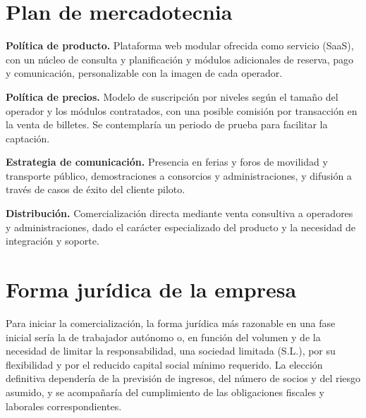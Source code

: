 \section{Plan de mercadotecnia}
\label{sec:negocio-marketing}

\textbf{Política de producto.} Plataforma web modular ofrecida como servicio (SaaS), con un núcleo de consulta y planificación y módulos adicionales de reserva, pago y comunicación, personalizable con la imagen de cada operador.

\textbf{Política de precios.} Modelo de suscripción por niveles según el tamaño del operador y los módulos contratados, con una posible comisión por transacción en la venta de billetes. Se contemplaría un periodo de prueba para facilitar la captación.

\textbf{Estrategia de comunicación.} Presencia en ferias y foros de movilidad y transporte público, demostraciones a consorcios y administraciones, y difusión a través de casos de éxito del cliente piloto.

\textbf{Distribución.} Comercialización directa mediante venta consultiva a operadores y administraciones, dado el carácter especializado del producto y la necesidad de integración y soporte.


\section{Forma jurídica de la empresa}
\label{sec:negocio-forma}

Para iniciar la comercialización, la forma jurídica más razonable en una fase inicial sería la de trabajador autónomo o, en función del volumen y de la necesidad de limitar la responsabilidad, una sociedad limitada (S.L.), por su flexibilidad y por el reducido capital social mínimo requerido. La elección definitiva dependería de la previsión de ingresos, del número de socios y del riesgo asumido, y se acompañaría del cumplimiento de las obligaciones fiscales y laborales correspondientes.
